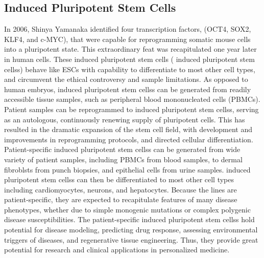 \documentclass[sigconf]{acmart}
\begin{document}
\subsection{Induced Pluripotent Stem Cells} 
In 2006, Shinya Yamanaka identified four transcription factors, (OCT4, SOX2, KLF4, and c-MYC), that were capable for reprogramming somatic mouse cells into a pluripotent state. This extraordinary feat was recapitulated one year later in human cells. These induced
pluripotent stem cells ( induced pluripotent stem cellss) behave like ESCs with capability to differentiate to most other cell
types, and circumvent the ethical controversy and sample limitations. As opposed to human
embryos,  induced pluripotent stem cellss can be generated from readily accessible tissue samples, such as peripheral
blood mononucleated cells (PBMCs). Patient samples can be reprogrammed to  induced pluripotent stem cellss, serving
as an autologous, continuously renewing supply of pluripotent cells.
This has resulted in the dramatic expansion of the stem cell field, with development and
improvements in reprogramming protocols, and directed cellular differentiation. Patient-specific
 induced pluripotent stem cellss can be generated from wide variety of patient samples, including PBMCs from blood
samples, to dermal fibroblsts from punch biopsies, and epithelial cells from urine samples.
 induced pluripotent stem cellss can then be differentiated to most other cell types including cardiomyocytes, neurons, and
hepatocytes. Because the lines are patient-specific, they are expected to recapitulate features of
many disease phenotypes, whether due to simple monogenic mutations or complex polygenic
disease susceptibilities. The patient-specific  induced pluripotent stem cellss hold potential for disease modeling,
predicting drug response, assessing environmental triggers of diseases, and regenerative tissue engineering. Thus, they provide
great potential for research and clinical applications in personalized medicine.
\end{document}
